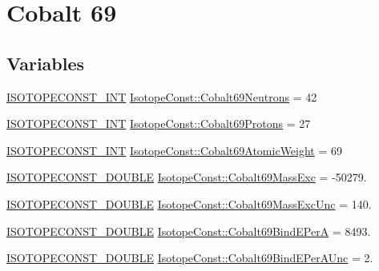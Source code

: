 \hypertarget{group___isotope_const-_cobalt-_co69}{}\section{Cobalt 69}
\label{group___isotope_const-_cobalt-_co69}
\subsection*{Variables}
\begin{DoxyCompactItemize}
\item 
\mbox{\hyperlink{group___isotope_const-_macros_ga5f18360b3e99483a35c32d789e62621c}{I\+S\+O\+T\+O\+P\+E\+C\+O\+N\+S\+T\+\_\+\+I\+NT}} \mbox{\hyperlink{group___isotope_const-_cobalt-_co69_gac68d82f2b13ec0deffcc9f8669e8f01b}{Isotope\+Const\+::\+Cobalt69\+Neutrons}} = 42
\item 
\mbox{\hyperlink{group___isotope_const-_macros_ga5f18360b3e99483a35c32d789e62621c}{I\+S\+O\+T\+O\+P\+E\+C\+O\+N\+S\+T\+\_\+\+I\+NT}} \mbox{\hyperlink{group___isotope_const-_cobalt-_co69_ga0be3db52a4384d575dd7c3f5fc9edcc7}{Isotope\+Const\+::\+Cobalt69\+Protons}} = 27
\item 
\mbox{\hyperlink{group___isotope_const-_macros_ga5f18360b3e99483a35c32d789e62621c}{I\+S\+O\+T\+O\+P\+E\+C\+O\+N\+S\+T\+\_\+\+I\+NT}} \mbox{\hyperlink{group___isotope_const-_cobalt-_co69_ga024617ca5677237e40a33a227cd3101e}{Isotope\+Const\+::\+Cobalt69\+Atomic\+Weight}} = 69
\item 
\mbox{\hyperlink{group___isotope_const-_macros_ga8f45a7272ce02c0b4c65c44636ed719a}{I\+S\+O\+T\+O\+P\+E\+C\+O\+N\+S\+T\+\_\+\+D\+O\+U\+B\+LE}} \mbox{\hyperlink{group___isotope_const-_cobalt-_co69_ga4d2c6843a27ff72b7046466d4f37a79a}{Isotope\+Const\+::\+Cobalt69\+Mass\+Exc}} = -\/50279.
\item 
\mbox{\hyperlink{group___isotope_const-_macros_ga8f45a7272ce02c0b4c65c44636ed719a}{I\+S\+O\+T\+O\+P\+E\+C\+O\+N\+S\+T\+\_\+\+D\+O\+U\+B\+LE}} \mbox{\hyperlink{group___isotope_const-_cobalt-_co69_ga963d360873216831ff4fc3296fb1f7f6}{Isotope\+Const\+::\+Cobalt69\+Mass\+Exc\+Unc}} = 140.
\item 
\mbox{\hyperlink{group___isotope_const-_macros_ga8f45a7272ce02c0b4c65c44636ed719a}{I\+S\+O\+T\+O\+P\+E\+C\+O\+N\+S\+T\+\_\+\+D\+O\+U\+B\+LE}} \mbox{\hyperlink{group___isotope_const-_cobalt-_co69_ga9ba0163c049013f8770bdceb7e435e5f}{Isotope\+Const\+::\+Cobalt69\+Bind\+E\+PerA}} = 8493.
\item 
\mbox{\hyperlink{group___isotope_const-_macros_ga8f45a7272ce02c0b4c65c44636ed719a}{I\+S\+O\+T\+O\+P\+E\+C\+O\+N\+S\+T\+\_\+\+D\+O\+U\+B\+LE}} \mbox{\hyperlink{group___isotope_const-_cobalt-_co69_ga1c7371a5daa5b4eedf4e0c4fad2dffb1}{Isotope\+Const\+::\+Cobalt69\+Bind\+E\+Per\+A\+Unc}} = 2.

\end{DoxyCompactItemize}
